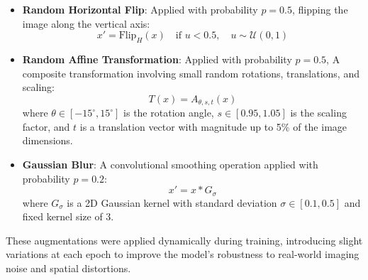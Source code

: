 \documentclass[11pt]{article}
\begin{document}
\begin{itemize}
\item \textbf{Random Horizontal Flip}: Applied with probability $p = 0.5$, flipping the image along the vertical axis:
\[
x' = \text{Flip}_H(x) \quad \text{if } u < 0.5, \quad u \sim \mathcal{U}(0, 1)
\]

\item \textbf{Random Affine Transformation}: Applied with probability $p = 0.5$, A composite transformation involving small random rotations, translations, and scaling:
\[
T(x) = A_{\theta, s, t}(x)
\]
where $\theta \in [-15^\circ, 15^\circ]$ is the rotation angle, $s \in [0.95, 1.05]$ is the scaling factor, and $t$ is a translation vector with magnitude up to 5\% of the image dimensions.

\item \textbf{Gaussian Blur}: A convolutional smoothing operation applied with probability $p = 0.2$:
\[
x' = x * G_{\sigma}
\]
where $G_{\sigma}$ is a 2D Gaussian kernel with standard deviation $\sigma \in [0.1, 0.5]$ and fixed kernel size of 3.
\end{itemize}

These augmentations were applied dynamically during training, introducing slight variations at each epoch to improve the model's robustness to real-world imaging noise and spatial distortions.
\end{document}
